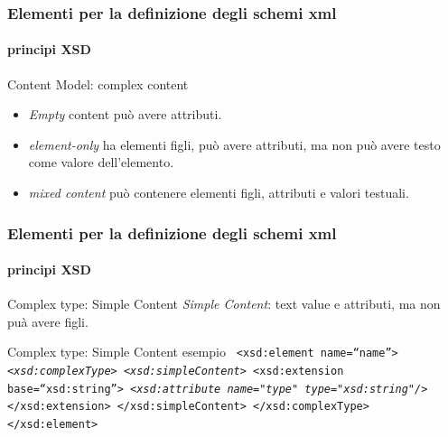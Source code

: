 \begin{frame}
	\frametitle{Elementi per la definizione degli schemi xml}
	\framesubtitle{principi XSD}
	\addtocounter{nframe}{1}

	\begin{block}{Content Model: complex content}
		\begin{itemize}
			\item \textit{Empty} content può avere attributi.
			\item \textit{element-only} ha elementi figli, può avere attributi, ma non può avere testo come valore dell'elemento.
			\item \textit{mixed content} può contenere elementi figli, attributi e valori testuali.
		\end{itemize}
	\end{block}
\end{frame}





\begin{frame}
	\frametitle{Elementi per la definizione degli schemi xml}
	\framesubtitle{principi XSD}
	\addtocounter{nframe}{1}

	\begin{block}{Complex type: Simple Content}
		\textit{Simple Content}: text value e attributi, ma non puà avere figli.
	\end{block}

	\begin{block}{Complex type: Simple Content esempio}
		\texttt{
			<xsd:element name=``name''>
			\emph{<xsd:complexType>}
			\emph{<xsd:simpleContent>}
			<xsd:extension base=``xsd:string''>
			\emph{<xsd:attribute name="type" type="xsd:string"/>}
			</xsd:extension>
			</xsd:simpleContent>
			</xsd:complexType>
			</xsd:element>
		}
	\end{block}
\end{frame}


